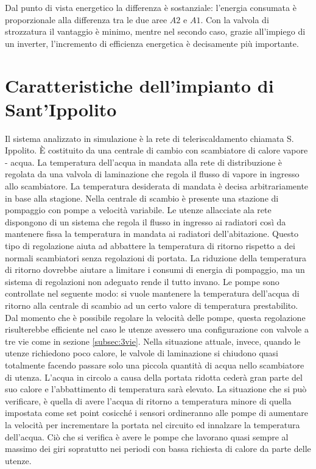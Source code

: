 \documentclass[laurea,oneside,11pt]{USiena_tesiLM}
\begin{document}
Dal punto di vista energetico la differenza è sostanziale: l'energia consumata è proporzionale alla differenza tra le due aree $A2$ e $A1$. Con la valvola di strozzatura il vantaggio è minimo, mentre nel secondo caso, grazie all'impiego di un inverter, l'incremento di efficienza energetica è decisamente più importante.


\section{Caratteristiche dell'impianto di Sant'Ippolito}
Il sistema analizzato in simulazione è la rete di teleriscaldamento chiamata S. Ippolito. \`E costituito da una centrale di cambio con scambiatore di calore vapore - acqua. La temperatura dell'acqua in mandata alla rete di distribuzione è regolata da una valvola di laminazione che regola il flusso di vapore in ingresso allo scambiatore. La temperatura desiderata di mandata è decisa arbitrariamente in base alla stagione. Nella centrale di scambio è presente una stazione di pompaggio con pompe a velocità variabile.
Le utenze allacciate ala rete dispongono di un sistema che regola il flusso in ingresso ai radiatori così da mantenere fissa la temperatura in mandata ai radiatori dell'abitazione. Questo tipo di regolazione aiuta ad abbattere la temperatura di ritorno rispetto a dei normali  scambiatori senza regolazioni di portata. La riduzione della temperatura di ritorno dovrebbe aiutare a limitare i consumi di energia di pompaggio, ma un sistema di regolazioni non adeguato rende il tutto invano. Le pompe sono controllate nel seguente modo: si vuole mantenere la temperatura dell'acqua di ritorno alla centrale di scambio ad un certo valore di temperatura prestabilito. Dal momento che è possibile regolare la velocità delle pompe, questa regolazione   risulterebbe efficiente nel caso le utenze avessero una configurazione con valvole a tre vie come in sezione \ref{subsec:3vie}. Nella situazione attuale, invece, quando le utenze richiedono poco calore, le valvole di laminazione si chiudono quasi totalmente facendo passare solo una piccola quantità di acqua nello scambiatore di utenza. L'acqua in circolo a causa della portata ridotta cederà gran parte del suo calore e l'abbattimento di temperatura sarà elevato. La situazione che si può verificare, è quella di avere l'acqua di ritorno a temperatura minore di quella impostata come set point cosicché i sensori ordineranno alle pompe di aumentare la velocità per incrementare la portata  nel circuito ed innalzare la temperatura dell'acqua. Ciò che si verifica è avere le pompe che lavorano quasi sempre al massimo dei giri sopratutto nei periodi con bassa richiesta di calore da parte delle utenze.
\end{document}
